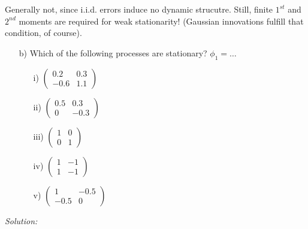 \documentclass[12pt,a4paper]{article}
\begin{document}
Generally not, since i.i.d. errors induce no dynamic strucutre. Still,
finite \(1^{st}\) and \(2^{nd}\) moments are required for weak
stationarity! (Gaussian innovations fulfill that condition, of course).

\begin{itemize}
 \item[b)] Which of the following processes are stationary? $\phi_{1} = \dots $ \\
\begin{itemize} 
    \item[i)] $ \begin{pmatrix}
    0.2 & 0.3 \\ 
    -0.6 & 1.1
    \end{pmatrix} $
    \hspace{8em}
    \item[ii)] $ \begin{pmatrix}
    0.5 & 0.3 \\ 
    0 & -0.3
    \end{pmatrix} $
    \item[iii)] $ \begin{pmatrix}
    1 & 0 \\ 
    0 & 1
    \end{pmatrix} $
    \hspace{8em}
    \item[iv)] $ \begin{pmatrix}
    1 & -1 \\ 
    1 & -1
    \end{pmatrix} $
    \hspace{8em}
    \item[v)] $ \begin{pmatrix}
    1 & -0.5 \\ 
    -0.5 & 0
    \end{pmatrix} $
\end{itemize}
\end{itemize}

\emph{Solution:}
\end{document}
